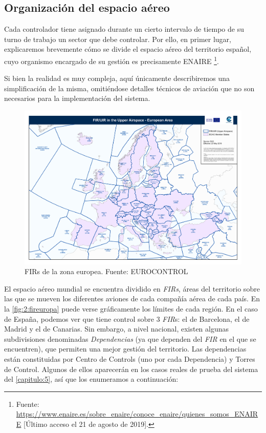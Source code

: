 \subsection{Organización del espacio aéreo}
\label{section:2:sectores-y-sectorizacion}
Cada controlador tiene asignado durante un cierto intervalo de tiempo de su turno de trabajo un sector que debe controlar.
Por ello, en primer lugar, explicaremos brevemente cómo se divide el espacio aéreo del territorio español, cuyo organismo encargado de su gestión es precisamente ENAIRE%
\footnote{Fuente: \url{https://www.enaire.es/sobre_enaire/conoce_enaire/quienes_somos_ENAIRE} [Último acceso el 21 de agosto de 2019].}.

Si bien la realidad es muy compleja, aquí únicamente describiremos una simplificación de la misma, omitiéndose
detalles técnicos de aviación que no son necesarios para la implementación del sistema.

\begin{figure}
	\centering
	\includegraphics[width=\linewidth]{FIR_europa}
	\caption[FIRs de la zona europea]{FIRs de la zona europea. Fuente: EUROCONTROL}
	\label{fig:2:fireuropa}
\end{figure}

El espacio aéreo mundial se encuentra dividido en \textit{\glspl{FIR}}, áreas del territorio sobre las que se mueven los diferentes aviones de cada compañía aérea de cada país. En la \autoref{fig:2:fireuropa} puede verse gráficamente los límites de cada región.
En el caso de España, podemos ver que tiene control sobre 3 \textit{FIR}s: el de Barcelona, el de Madrid y el de Canarias. Sin embargo, a nivel nacional, existen algunas subdivisiones denominadas \textit{Dependencias} (ya que dependen del \textit{FIR} en el que se encuentren), que permiten una mejor gestión del territorio. Las dependencias están constituidas por \glspl{Centro de Control} (uno por cada Dependencia) y Torres de Control. Algunos de ellos aparecerán en los casos reales de prueba del sistema del \autoref{capitulo:5}, así que los enumeramos a continuación:

